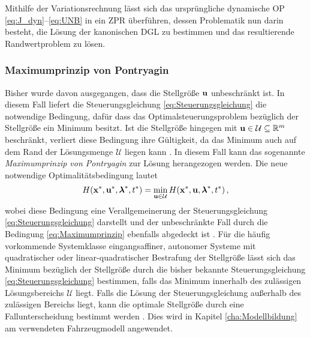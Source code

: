 Mithilfe der Variationsrechnung lässt sich das ursprüngliche dynamische \gls{OP} \eqref{eq:J_dyn}--\eqref{eq:UNB} in ein \gls{ZPR} überführen, dessen Problematik nun darin besteht, die Lösung der kanonischen \gls{DGL} zu bestimmen und das resultierende Randwertproblem zu lösen. 

\subsubsection{Maximumprinzip von Pontryagin}\label{subsubsec:Maximumprinzip}
Bisher wurde davon ausgegangen, dass die Stellgröße $\boldsymbol{\mathrm{u}}$ unbeschränkt ist. In diesem Fall liefert die Steuerungsgleichung \eqref{eq:Steuerungsgleichung} die notwendige Bedingung, dafür dass das Optimalsteuerungsproblem bezüglich der Stellgröße ein Minimum besitzt. Ist die Stellgröße hingegen mit $\boldsymbol{\mathrm{u}}\in\mathcal{U}\subseteq\mathbb{R}^m $ beschränkt, verliert diese Bedingung ihre Gültigkeit, da das Minimum auch auf dem Rand der Lösungsmenge $\mathcal{U}$ liegen kann \cite{KnutGraichen.2012}. In diesem Fall kann das sogenannte \textit{Maximumprinzip von Pontryagin} zur Lösung herangezogen werden. Die neue notwendige Optimalitätsbedingung lautet
\begin{equation}
	H(\boldsymbol{\mathrm{x}}^*, \boldsymbol{\mathrm{u}}^*, \boldsymbol{\mathrm{\lambda}}^*, t^*) = \min_{\boldsymbol{\mathrm{u}}\in\mathcal{U}} H(\boldsymbol{\mathrm{x}}^*, \boldsymbol{\mathrm{u}}, \boldsymbol{\mathrm{\lambda}}^*, t^*)\,, \label{eq:Maximumprinzip}
\end{equation}
wobei diese Bedingung eine Verallgemeinerung der Steuerungsgleichung \eqref{eq:Steuerungsgleichung} darstellt und der unbeschränkte Fall durch die Bedingung \eqref{eq:Maximumprinzip} ebenfalls abgedeckt ist \cite{KnutGraichen.2012}. Für die häufig vorkommende Systemklasse eingangsaffiner, autonomer Systeme mit quadratischer oder linear-quadratischer Bestrafung der Stellgröße lässt sich das Minimum bezüglich der Stellgröße durch die bisher bekannte Steuerungsgleichung \eqref{eq:Steuerungsgleichung} bestimmen, falls das Minimum innerhalb des zulässigen Lösungsbereichs $\mathcal{U}$ liegt. Falls die Lösung der Steuerungsgleichung außerhalb des zulässigen Bereichs liegt, kann die optimale Stellgröße durch eine Fallunterscheidung bestimmt werden \cite{KnutGraichen.2012}. Dies wird in Kapitel \ref{cha:Modellbildung} am verwendeten Fahrzeugmodell angewendet.

